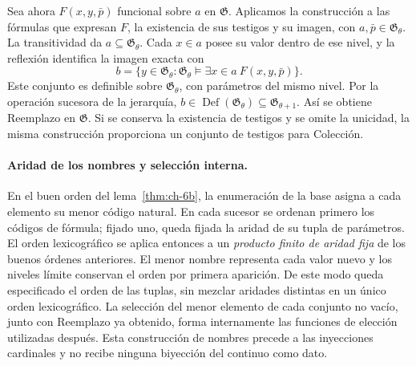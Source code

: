 Sea ahora \(F(x,y,\bar p)\) funcional sobre \(a\) en \(\mathfrak G\).
Aplicamos la construcción a las fórmulas que expresan \(F\), la existencia
de sus testigos y su imagen, con \(a,\bar p\in\mathfrak G_\theta\).
La transitividad da \(a\subseteq\mathfrak G_\theta\). Cada
\(x\in a\) posee su valor dentro de ese nivel, y la reflexión identifica
la imagen exacta con
\[
 b=\{y\in\mathfrak G_\theta:
       \mathfrak G_\theta\models
       \exists x\in a\ F(x,y,\bar p)\}.
\]
Este conjunto es definible sobre \(\mathfrak G_\theta\), con parámetros
del mismo nivel. Por la operación sucesora de la jerarquía,
\(b\in\operatorname{Def}(\mathfrak G_\theta)
\subseteq\mathfrak G_{\theta+1}\). Así se obtiene Reemplazo en
\(\mathfrak G\). Si se conserva la existencia de testigos y se omite la
unicidad, la misma construcción proporciona un conjunto de testigos para
Colección.

\paragraph{Aridad de los nombres y selección interna.}
En el buen orden del lema~\ref{thm:ch-6b}, la enumeración de la base
asigna a cada elemento su menor código natural. En cada sucesor se ordenan
primero los códigos de fórmula; fijado uno, queda fijada la aridad de su
tupla de parámetros. El orden lexicográfico se aplica entonces a un
\emph{producto finito de aridad fija} de los buenos órdenes anteriores.
El menor nombre representa cada valor nuevo y los niveles límite conservan
el orden por primera aparición. De este modo queda especificado el orden
de las tuplas, sin mezclar aridades distintas en un único orden
lexicográfico. La selección del menor elemento de cada conjunto no vacío,
junto con Reemplazo ya obtenido, forma internamente las funciones de
elección utilizadas después. Esta construcción de nombres precede a las
inyecciones cardinales y no recibe ninguna biyección del continuo como
dato.
